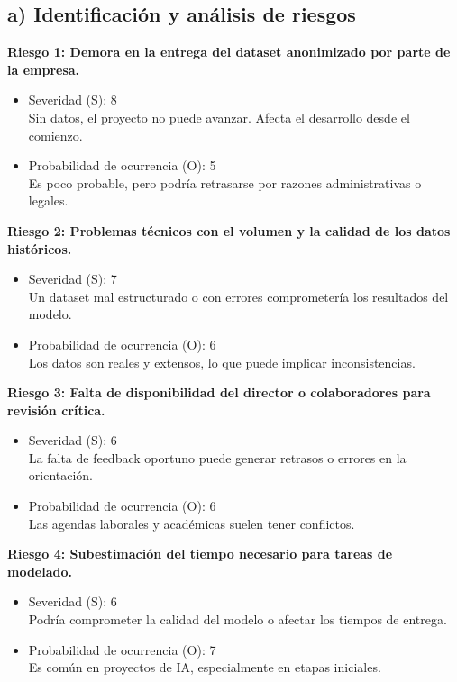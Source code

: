 \documentclass[
11pt, %
]{charter}
\begin{document}
\subsection*{a) Identificación y análisis de riesgos}

\textbf{Riesgo 1: Demora en la entrega del dataset anonimizado por parte de la empresa.}
\begin{itemize}
  \item Severidad (S): 8 \\
  Sin datos, el proyecto no puede avanzar. Afecta el desarrollo desde el comienzo.
  \item Probabilidad de ocurrencia (O): 5 \\
  Es poco probable, pero podría retrasarse por razones administrativas o legales.
\end{itemize}

\textbf{Riesgo 2: Problemas técnicos con el volumen y la calidad de los datos históricos.}
\begin{itemize}
  \item Severidad (S): 7 \\
  Un dataset mal estructurado o con errores comprometería los resultados del modelo.
  \item Probabilidad de ocurrencia (O): 6 \\
  Los datos son reales y extensos, lo que puede implicar inconsistencias.
\end{itemize}

\textbf{Riesgo 3: Falta de disponibilidad del director o colaboradores para revisión crítica.}
\begin{itemize}
  \item Severidad (S): 6 \\
  La falta de feedback oportuno puede generar retrasos o errores en la orientación.
  \item Probabilidad de ocurrencia (O): 6 \\
  Las agendas laborales y académicas suelen tener conflictos.
\end{itemize}

\textbf{Riesgo 4: Subestimación del tiempo necesario para tareas de modelado.}
\begin{itemize}
  \item Severidad (S): 6 \\
  Podría comprometer la calidad del modelo o afectar los tiempos de entrega.
  \item Probabilidad de ocurrencia (O): 7 \\
  Es común en proyectos de IA, especialmente en etapas iniciales.
\end{itemize}
\end{document}
